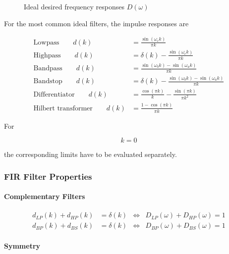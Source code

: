 \begin{figure}[htp]
\caption{Ideal desired frequency responses $D(\omega)$}
\label{fig:freqresp}

\end{figure}


For the most common ideal filters, the impulse responses are

\begin{align*}
\text{Lowpass} \qquad
d(k)
&=
\frac{\sin(\omega_ck)}
{\pi k}
\\[1ex]
\text{Highpass} \qquad
d(k)
&=
\delta(k)
-
\frac{\sin(\omega_ck)}
{\pi k}
\\[1ex]
\text{Bandpass} \qquad
d(k)
&=
\frac
{\sin(\omega_bk)-\sin(\omega_ak)}
{\pi k}
\\[1ex]
\text{Bandstop} \qquad
d(k)
&=
\delta(k)
-
\frac
{\sin(\omega_bk)-\sin(\omega_ak)}
{\pi k}
\\[1ex]
\text{Differentiator} \qquad
d(k)
&=
\frac{\cos(\pi k)}{k}
-
\frac{\sin(\pi k)}
{\pi k^2}
\\[1ex]
\text{Hilbert transformer} \qquad
d(k)
&=
\frac{1-\cos(\pi k)}
{\pi k}
\end{align*}

For

\[
k=0
\]

the corresponding limits have to be evaluated separately.

\subsubsection{FIR Filter Properties}

\paragraph{Complementary Filters}

\begin{align*}
d_{LP}(k)+d_{HP}(k)&=\delta(k)
&
\Longleftrightarrow
&
D_{LP}(\omega)+D_{HP}(\omega)=1
\\
d_{BP}(k)+d_{BS}(k)&=\delta(k)
&
\Longleftrightarrow
&
D_{BP}(\omega)+D_{BS}(\omega)=1
\end{align*}


\paragraph{Symmetry}

